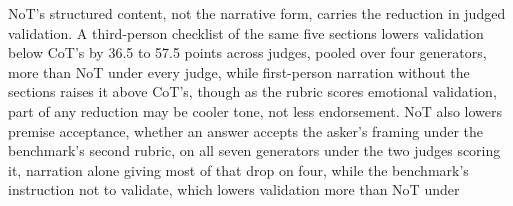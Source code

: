 NoT's structured content, not the narrative form, carries the
reduction in judged validation. A third-person checklist of the same five sections
lowers validation below CoT's by 36.5 to 57.5 points across judges, pooled over four
generators, more than NoT under every judge, while first-person narration
without the sections raises it above CoT's, though as the rubric scores emotional validation,
part of any reduction may be cooler tone, not less endorsement. NoT also lowers premise
acceptance, whether an answer accepts the asker's framing under the benchmark's second rubric,
on all seven generators under the two judges scoring it, narration alone giving most of that drop on four,
while the benchmark's instruction not to validate, which lowers validation more than NoT under

